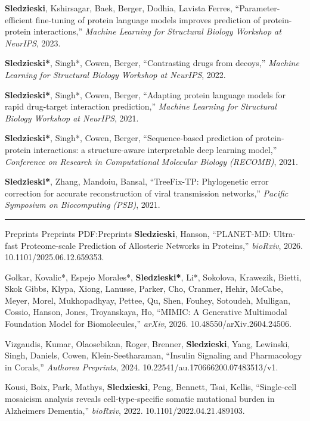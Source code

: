 \documentclass[letterpaper,MMMyyyy,nonstopmode]{simpleresumecv}
\begin{document}
\begin{Body}
\Gap
\NumberedItem{[5]}
{{\textbf{Sledzieski}, Kshirsagar, Baek, Berger, Dodhia, Lavista Ferres}, 
``Parameter-efficient fine-tuning of protein language models improves prediction of protein-protein interactions,'' 
\textit{Machine Learning for Structural Biology Workshop at NeurIPS}, 2023.
}

\Gap
\NumberedItem{[4]}
{{\textbf{Sledzieski*}, Singh*, Cowen, Berger}, 
``Contrasting drugs from decoys,'' 
\textit{Machine Learning for Structural Biology Workshop at NeurIPS}, 2022.
}

\Gap
\NumberedItem{[3]}
{{\textbf{Sledzieski*}, Singh*, Cowen, Berger}, 
``Adapting protein language models for rapid drug-target interaction prediction,'' 
\textit{Machine Learning for Structural Biology Workshop at NeurIPS}, 2021.
}

\Gap
\NumberedItem{[2]}
{{\textbf{Sledzieski*}, Singh*, Cowen, Berger}, 
``Sequence-based prediction of protein-protein interactions: a structure-aware interpretable deep learning model,'' 
\textit{Conference on Research in Computational Molecular Biology (RECOMB)}, 2021.
}

\Gap
\NumberedItem{[1]}
{{\textbf{Sledzieski*}, Zhang, Mandoiu, Bansal}, 
``TreeFix-TP: Phylogenetic error correction for accurate reconstruction of viral transmission networks,'' 
\textit{Pacific Symposium on Biocomputing (PSB)}, 2021.
}


\BigGap
\hrule
\Section
{Preprints}
{Preprints}
{PDF:Preprints}
\Gap
\NumberedItem{[4]}
{{\textbf{Sledzieski}, Hanson}, 
``PLANET-MD: Ultra-fast Proteome-scale Prediction of Allosteric Networks in Proteins,'' 
\textit{bioRxiv}, 2026. 10.1101/2025.06.12.659353.
}

\Gap
\NumberedItem{[3]}
{{Golkar, Kovalic*, Espejo Morales*, \textbf{Sledzieski*}, Li*, Sokolova, Krawezik, Bietti, Skok Gibbs, Klypa, Xiong, Lanusse, Parker, Cho, Cranmer, Hehir, McCabe, Meyer, Morel, Mukhopadhyay, Pettee, Qu, Shen, Fouhey, Sotoudeh, Mulligan, Cossio, Hanson, Jones, Troyanskaya, Ho}, 
``MIMIC: A Generative Multimodal Foundation Model for Biomolecules,'' 
\textit{arXiv}, 2026. 10.48550/arXiv.2604.24506.
}

\Gap
\NumberedItem{[2]}
{{Vizgaudis, Kumar, Olaosebikan, Roger, Brenner, \textbf{Sledzieski}, Yang, Lewinski, Singh, Daniels, Cowen, Klein-Seetharaman}, 
``Insulin Signaling and Pharmacology in Corals,'' 
\textit{Authorea Preprints}, 2024. 10.22541/au.170666200.07483513/v1.
}

\Gap
\NumberedItem{[1]}
{{Kousi, Boix, Park, Mathys, \textbf{Sledzieski}, Peng, Bennett, Tsai, Kellis}, 
``Single-cell mosaicism analysis reveals cell-type-specific somatic mutational burden in Alzheimers Dementia,'' 
\textit{bioRxiv}, 2022. 10.1101/2022.04.21.489103.
}




\end{Body}
\end{document}
